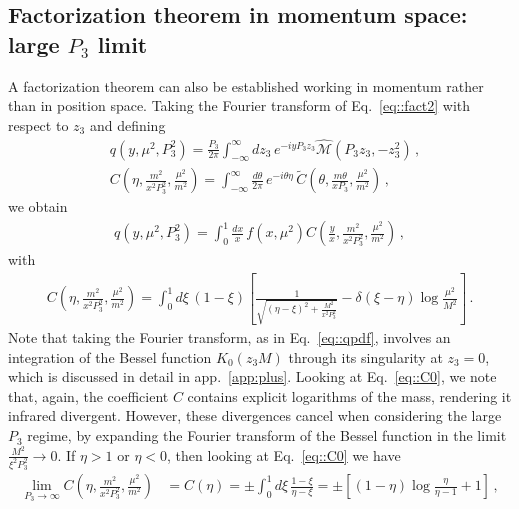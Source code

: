 \subsection{Factorization theorem in momentum space: large $P_3$ limit}
\label{sec::momentumspace}

A factorization theorem can also be established working in momentum rather than
in position space. Taking the Fourier transform of Eq.~\eqref{eq::fact2} with
respect to $z_3$ and defining
\begin{align}
	\label{eq::qpdf}
	&q\left(y, \mu^2, P_3^2\right) = 
	\frac{P_3}{2\pi} 
	\int_{-\infty}^{\infty}dz_3\, e^{-i y P_3 z_3} 
	\widehat{\mathcal{M}}\left(P_3 z_3, -z_3^2\right)\, , \\
	\label{eq::matching0}
	&C\left(\eta,\frac{m^2}{x^2 P_3^2}, \frac{\mu^2}{m^2}\right) = 
	\int_{-\infty}^{\infty}\frac{d\theta}{2\pi}\, e^{-i\theta\eta}\,
	\tilde{C}\left(\theta, \frac{m\theta}{x P_3}, \frac{\mu^2}{m^2} \right)\, ,
\end{align}
we obtain
\begin{align}
	\label{eq::matching1}
	q\left(y, \mu^2, P_3^2\right) = 
	\int_{0}^{1} \frac{d x}{x}\, f\left(x,\mu^2\right) 
	C\left(\frac{y}{x},\frac{m^2}{x^2 P_3^2}, \frac{\mu^2}{m^2}\right)\, ,
\end{align}
with
\begin{align}
	\label{eq::C0}
	C\left(\eta,\frac{m^2}{x^2 P_3^2}, \frac{\mu^2}{m^2}\right) = 
	\int_0^1 d\xi \, \left(1-\xi\right) 
	\left[\frac{1}{\sqrt{\left(\eta-\xi\right)^2
	 + \frac{M^2}{x^2P_3^2}}} - 
	 \delta\left(\xi-\eta\right) \log\frac{\mu^2}{M^2}\right]\, .
\end{align}
Note that taking the Fourier transform, as in Eq.~\eqref{eq::qpdf}, involves an
integration of the Bessel function $K_0\left(z_3 M\right)$ through its
singularity at $z_3=0$, which is discussed in detail in app.~\ref{app:plus}.
Looking at Eq.~\eqref{eq::C0}, we note that, again, the coefficient $C$ contains
explicit logarithms of the mass, rendering it infrared divergent. However, these
divergences cancel when considering the large $P_3$ regime, by expanding the
Fourier transform of the Bessel function in the limit
$\frac{M^2}{\xi^2P_3^2}\rightarrow 0$. If $\eta>1$ or $\eta<0$, then looking at
Eq.~\eqref{eq::C0} we have 
\begin{align}
	\lim_{P_3\rightarrow \infty} 
	C\left(\eta,\frac{m^2}{x^2 P_3^2}, \frac{\mu^2}{m^2}\right) &= 
	C\left(\eta\right) = 
	\pm \int_0^1 d\xi \,\frac{1-\xi}{\eta-\xi} = 
	\pm \left[\left(1-\eta\right) \log\frac{\eta}{\eta-1} + 1 \right]\, ,
\end{align}
